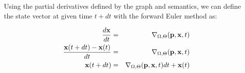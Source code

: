 Using the partial derivatives defined by the \Petrinet{} graph and semantics, we
can define the state vector at given time $t+dt$ with the forward Euler method
as:

\begin{eqnarray*}
	\frac{d {\bf x}}{dt} &=& \nabla_{\Omega, \Theta}({\bf p},{\bf x}, t)\\
	\frac{{\bf x}(t+dt)-{\bf x}(t)}{dt} &=& \nabla_{\Omega, \Theta}({\bf p},{\bf x},
	t)\\
	{\bf x}(t+dt)&=& \nabla_{\Omega, \Theta}({\bf p},{\bf x}, t)dt+ {\bf x}(t)
\end{eqnarray*}

